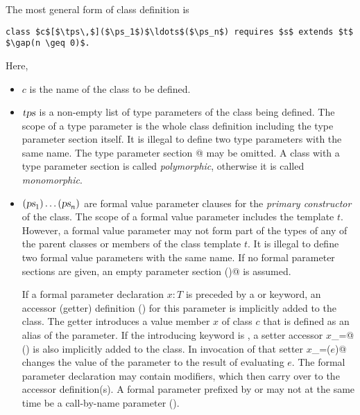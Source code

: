 The most general form of class definition is 
\begin{lstlisting}
class $c$[$\tps\,$]($\ps_1$)$\ldots$($\ps_n$) requires $s$ extends $t$    $\gap(n \geq 0)$.
\end{lstlisting}
Here,
\begin{itemize}
\item[]
$c$ is the name of the class to be defined.
\item[] $\mbox{\sl tps}$ is a non-empty list of type parameters of the class
being defined.  The scope of a type parameter is the whole class
definition including the type parameter section itself.  It is
illegal to define two type parameters with the same name.  The type
parameter section \lstinline@[$\tps\,$]@ may be omitted. A class with a type
parameter section is called {\em polymorphic}, otherwise it is called
{\em monomorphic}.
\item[] 
$(\mbox{\sl ps}_1)\ldots(\mbox{\sl ps}_n)$ are formal value parameter clauses for the {\em primary
constructor} of the class. The scope of a formal value parameter includes
the template $t$. However, a formal value parameter may not form 
part of the types of any of the parent classes or members of the class
template $t$.
It is illegal to define two formal value parameters with the same name.
If no formal parameter sections are given, 
an empty parameter section \lstinline@()@ is assumed.

If a formal parameter declaration $x: T$ is preceded by a 
or  keyword, an accessor (getter) definition
() for this parameter is implicitly added to the
class. The getter introduces a value member $x$ of class $c$ that is
defined as an alias of the parameter. If the introducing keyword is
, a setter accessor \lstinline@$x$_=@ () is also
implicitly added to the class. In invocation of that setter \lstinline@$x$_=($e$)@
changes the value of the parameter to the result of evaluating $e$.
The formal parameter declaration may contain modifiers, which then
carry over to the accessor definition(s). A formal parameter prefixed
by  or  may not at the same time be a call-by-name
parameter ().


\end{itemize}
